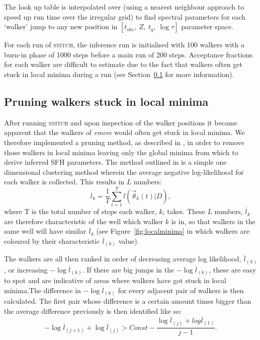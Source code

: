 \documentclass[useAMS,usenatbib]{mn2e}
\begin{document}
The look up table is interpolated over (using a nearest neighbour approach to speed up run time over the irregular grid) to find spectral parameters for each `walker' jump to any new position in $[t_{obs},~Z,~t_q,~\log\tau]$ parameter space. 

For each run of \textsc{snitch}, the inference run is initialised with 100 walkers with a burn-in phase of 1000 steps before a main run of 200 steps. Acceptance fractions for each walker are difficult to estimate due to the fact that walkers often get stuck in local minima during a run (see Section~\ref{sec:pruning} for more information). 



\subsection{Pruning walkers stuck in local minima}\label{sec:pruning}




After running \textsc{snitch} and upon inspection of the walker positions it became apparent that the walkers of \emph{emcee} would often get stuck in local minima. We therefore implemented a pruning method, as described in \cite{hou12}, in order to remove those walkers in local minima leaving only the global minima from which to derive inferred SFH parameters. The method outlined in \cite{hou12} is a simple one dimensional clustering method wherein the average negative log-likelihood for each walker is collected. This results in $L$ numbers:
\begin{equation}
\overline{l}_k = \frac{1}{T} \sum^{T}_{t=1} l(\vec{\theta}_k(t)|D),
\end{equation}
where T is the total number of steps each walker, $k$, takes. These $L$ numbers, $\overline{l}_k$ are therefore characteristic of the well which walker $k$ is in, so that walkers in the same well will have similar $\overline{l}_k$ (see Figure~\ref{fig:localminima} in which walkers are coloured by their characteristic $\overline{l}_{(k)}$ value). 


The walkers are all then ranked in order of decreasing average log likelihood, $\overline{l}_{(k)}$, or increasing $- \log \overline{l}_{(k)}$. If there are big jumps in the $- \log \overline{l}_{(k)}$, these are easy to spot and are indicative of areas where walkers have got stuck in local minima.The difference in $- \log \overline{l}_{(k)}$ for every adjacent pair of walkers is then calculated. The first pair whose difference is a certain amount times bigger than the average difference previously is then identified like so:
\begin{equation}
-\log \overline{l}_{(j+1)} + \log \overline{l}_{(j)} > Const − \frac{\log \overline{l}_{(j)} + log \overline{l}_{(1)}}{j - 1}.
\end{equation}
\end{document}
